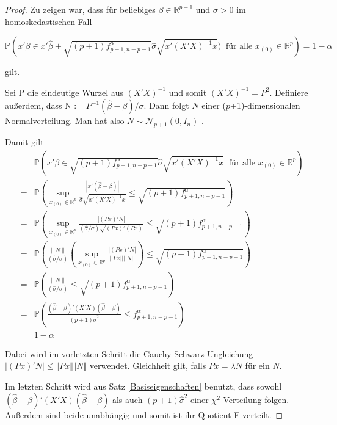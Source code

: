 \documentclass[12pt,a4paper]{article}
\theoremstyle{definition}
\theoremstyle{definition}
\theoremstyle{definition}
\theoremstyle{definition}
\begin{document}
\begin{proof}
Zu zeigen war, dass für beliebiges $\beta \in \mathbb{R}^{p+1}$ und $\sigma > 0$  im homoskedastischen Fall

\begin{equation*}
\mathbb{P} \left( x'\beta \in x' \hat{\beta} \pm \sqrt{(p+1) f^{\alpha}_{p+1,n-p-1}} \hat{\sigma} \sqrt{x' (X'X)^{-1}x}) ~ \text{ für alle } x_{(0)} \in \mathbb{R}^{p} \right) = 1 - \alpha
\end{equation*}

gilt. 

Sei \gls{P} die eindeutige Wurzel aus $(X'X)^{-1}$ und somit $(X'X)^{-1} = P^2$. Definiere außerdem, dass \gls{N} := $P^{-1}(\hat{\beta}-\beta)/\sigma$. Dann folgt $N$ einer ($p$+1)-dimensionalen Normalverteilung. Man hat also $N \sim \mathscr{N}_{p+1}(0,I_n)$ . 

Damit gilt
\begin{eqnarray*}
&&\mathbb{P} \left( x'\beta \in \sqrt{(p+1) f^{\alpha}_{p+1,n-p-1}} \hat{\sigma} \sqrt{x'(X'X)^{-1}x} ~ \text{ für alle } x_{(0)} \in \mathbb{R}^{p} \right) \\ 
&=& \mathbb{P} \left( \sup_{x_{(0)} \in \mathbb{R}^{p}} \frac{|x'(\hat{\beta}-\beta)|}{\hat{\sigma} \sqrt{x'(X'X)^{-1}x}} \leq \sqrt{(p+1) f^{\alpha}_{p+1,n-p-1}} \right) \\
&=& \mathbb{P} \left( \sup_{x_{(0)} \in \mathbb{R}^{p}} \frac{|(Px)'N|}{(\hat{\sigma}/\sigma)\sqrt{(Px)'(Px)}} \leq \sqrt{(p+1) f^{\alpha}_{p+1,n-p-1}} \right) \\
&=& \mathbb{P} \left( \frac{\parallel N \parallel}{(\hat{\sigma}/\sigma)} \left( \sup_{x_{(0)} \in \mathbb{R}^{p}} \frac{|(Px)'N|}{||Px|| ||N||} \right) \leq \sqrt{(p+1) f^{\alpha}_{p+1,n-p-1}} \right) \\
&=& \mathbb{P} \left(\frac{\parallel N \parallel}{(\hat{\sigma}/\sigma)} \leq \sqrt{(p+1) f^{\alpha}_{p+1,n-p-1}} \right) \\
&=& \mathbb{P} \left(\frac{(\hat{\beta}-\beta)'(X'X)(\hat{\beta}-\beta)}{(p+1)\hat{\sigma}^2} \leq f^{\alpha}_{p+1,n-p-1} \right) \\
&=& 1 - \alpha
\end{eqnarray*}

Dabei wird im vorletzten Schritt  die Cauchy-Schwarz-Ungleichung $ \vert (Px)'N \vert \leq \Vert Px \Vert \Vert N \Vert $ verwendet. Gleichheit gilt, falls $P x = \lambda N$ für ein $N$. 

Im letzten Schritt wird aus Satz \ref{Basiseigenschaften} benutzt, dass sowohl $(\hat{\beta}-\beta)'(X'X)(\hat{\beta}-\beta)$ als auch $(p+1)\hat{\sigma}^2$ einer $\chi^2$-Verteilung folgen. Außerdem sind beide unabhängig und somit ist ihr Quotient F-verteilt.

\end{proof}
\end{document}
